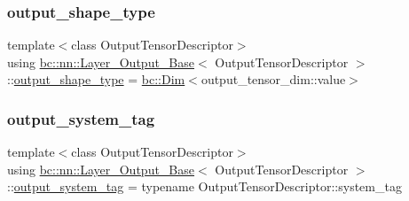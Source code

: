 \subsubsection{\texorpdfstring{output\+\_\+shape\+\_\+type}{output\_shape\_type}\hspace{0.1cm}{\footnotesize\ttfamily [2/2]}}
{\footnotesize\ttfamily template$<$class Output\+Tensor\+Descriptor$>$ \\
using \hyperlink{structbc_1_1nn_1_1Layer__Output__Base}{bc\+::nn\+::\+Layer\+\_\+\+Output\+\_\+\+Base}$<$ Output\+Tensor\+Descriptor $>$\+::\hyperlink{structbc_1_1nn_1_1Layer__Output__Base_aa627047014ee5dff2b9cc1804c791815}{output\+\_\+shape\+\_\+type} =  \hyperlink{structbc_1_1Dim}{bc\+::\+Dim}$<$output\+\_\+tensor\+\_\+dim\+::value$>$}

\mbox{\label{structbc_1_1nn_1_1Layer__Output__Base_ab95900f0cbd689cd1d2c187ac8d4ddd0}} 
\subsubsection{\texorpdfstring{output\+\_\+system\+\_\+tag}{output\_system\_tag}\hspace{0.1cm}{\footnotesize\ttfamily [1/2]}}
{\footnotesize\ttfamily template$<$class Output\+Tensor\+Descriptor$>$ \\
using \hyperlink{structbc_1_1nn_1_1Layer__Output__Base}{bc\+::nn\+::\+Layer\+\_\+\+Output\+\_\+\+Base}$<$ Output\+Tensor\+Descriptor $>$\+::\hyperlink{structbc_1_1nn_1_1Layer__Output__Base_ab95900f0cbd689cd1d2c187ac8d4ddd0}{output\+\_\+system\+\_\+tag} =  typename Output\+Tensor\+Descriptor\+::system\+\_\+tag}

\mbox{\label{structbc_1_1nn_1_1Layer__Output__Base_ab95900f0cbd689cd1d2c187ac8d4ddd0}} 
